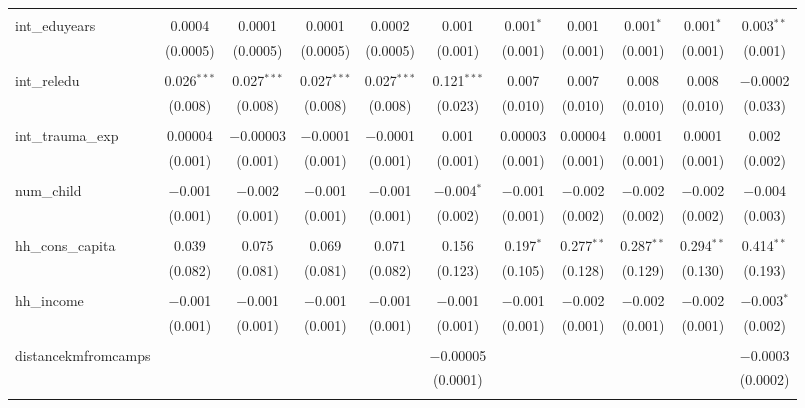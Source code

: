 \begin{table}[H]
\begin{tabular}{@{\extracolsep{4pt}}lcccccccccc}
  & & & & & & & & & & \\ 
 int\_eduyears & 0.0004 & 0.0001 & 0.0001 & 0.0002 & 0.001 & 0.001$^{*}$ & 0.001 & 0.001$^{*}$ & 0.001$^{*}$ & 0.003$^{**}$ \\ 
  & (0.0005) & (0.0005) & (0.0005) & (0.0005) & (0.001) & (0.001) & (0.001) & (0.001) & (0.001) & (0.001) \\ 
  & & & & & & & & & & \\ 
 int\_reledu & 0.026$^{***}$ & 0.027$^{***}$ & 0.027$^{***}$ & 0.027$^{***}$ & 0.121$^{***}$ & 0.007 & 0.007 & 0.008 & 0.008 & $-$0.0002 \\ 
  & (0.008) & (0.008) & (0.008) & (0.008) & (0.023) & (0.010) & (0.010) & (0.010) & (0.010) & (0.033) \\ 
  & & & & & & & & & & \\ 
 int\_trauma\_exp & 0.00004 & $-$0.00003 & $-$0.0001 & $-$0.0001 & 0.001 & 0.00003 & 0.00004 & 0.0001 & 0.0001 & 0.002 \\ 
  & (0.001) & (0.001) & (0.001) & (0.001) & (0.001) & (0.001) & (0.001) & (0.001) & (0.001) & (0.002) \\ 
  & & & & & & & & & & \\ 
 num\_child & $-$0.001 & $-$0.002 & $-$0.001 & $-$0.001 & $-$0.004$^{*}$ & $-$0.001 & $-$0.002 & $-$0.002 & $-$0.002 & $-$0.004 \\ 
  & (0.001) & (0.001) & (0.001) & (0.001) & (0.002) & (0.001) & (0.002) & (0.002) & (0.002) & (0.003) \\ 
  & & & & & & & & & & \\ 
 hh\_cons\_capita & 0.039 & 0.075 & 0.069 & 0.071 & 0.156 & 0.197$^{*}$ & 0.277$^{**}$ & 0.287$^{**}$ & 0.294$^{**}$ & 0.414$^{**}$ \\ 
  & (0.082) & (0.081) & (0.081) & (0.082) & (0.123) & (0.105) & (0.128) & (0.129) & (0.130) & (0.193) \\ 
  & & & & & & & & & & \\ 
 hh\_income & $-$0.001 & $-$0.001 & $-$0.001 & $-$0.001 & $-$0.001 & $-$0.001 & $-$0.002 & $-$0.002 & $-$0.002 & $-$0.003$^{*}$ \\ 
  & (0.001) & (0.001) & (0.001) & (0.001) & (0.001) & (0.001) & (0.001) & (0.001) & (0.001) & (0.002) \\ 
  & & & & & & & & & & \\ 
 distancekmfromcamps &  &  &  &  & $-$0.00005 &  &  &  &  & $-$0.0003 \\ 
  &  &  &  &  & (0.0001) &  &  &  &  & (0.0002) \\ 
  & & & & & & & & & & \\ 

\end{tabular}
\end{table}
